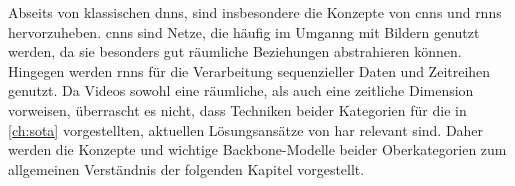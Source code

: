 





Abseits von klassischen \glspl{dnn}, sind insbesondere die Konzepte von \glspl{cnn} und \glspl{rnn} hervorzuheben.
\glspl{cnn} sind Netze, die häufig im Umganng mit Bildern genutzt werden, da sie besonders gut räumliche Beziehungen abstrahieren können.
Hingegen werden \glspl{rnn} für die Verarbeitung sequenzieller Daten und Zeitreihen genutzt.
Da Videos sowohl eine räumliche, als auch eine zeitliche Dimension vorweisen, überrascht es nicht, dass Techniken beider Kategorien für die in \autoref{ch:sota} vorgestellten, aktuellen Lösungsansätze von \gls{har} relevant sind.
Daher werden die Konzepte und wichtige Backbone-Modelle beider Oberkategorien zum allgemeinen Verständnis der folgenden Kapitel vorgestellt.

